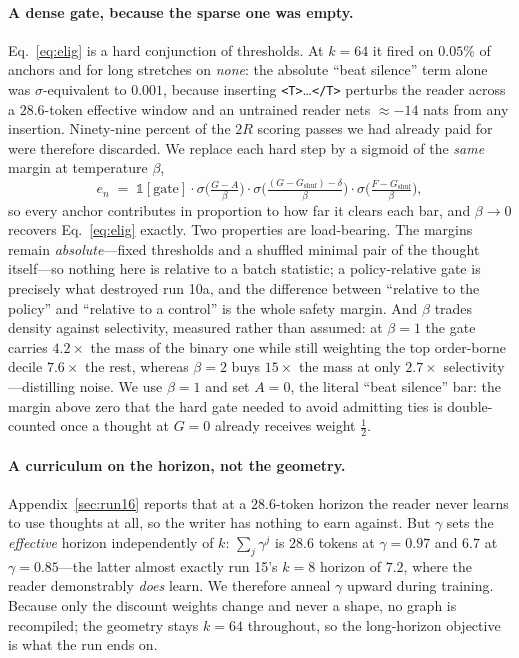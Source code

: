 \documentclass{article} %
\newcommand{\gain}{G}
\newcommand{\tstart}{\texttt{<T>}}
\newcommand{\tend}{\texttt{</T>}}
\begin{document}
\paragraph{A dense gate, because the sparse one was empty.} Eq.~\eqref{eq:elig} is a hard conjunction of thresholds. At $k{=}64$ it fired on $0.05\%$ of anchors and for long stretches on \emph{none}: the absolute ``beat silence'' term alone was $\sigma$-equivalent to $0.001$, because inserting \tstart{}\ldots\tend{} perturbs the reader across a $28.6$-token effective window and an untrained reader nets ${\approx}{-}14$ nats from any insertion. Ninety-nine percent of the $2R$ scoring passes we had already paid for were therefore discarded. We replace each hard step by a sigmoid of the \emph{same} margin at temperature $\beta$,
\begin{equation}
e_n \;=\; \mathbb{1}[\text{gate}] \cdot
\sigma\!\Big(\tfrac{\gain - A}{\beta}\Big)\cdot
\sigma\!\Big(\tfrac{(\gain - \gain_{\mathrm{shuf}}) - \delta}{\beta}\Big)\cdot
\sigma\!\Big(\tfrac{F - \gain_{\mathrm{shuf}}}{\beta}\Big),
\label{eq:softelig}
\end{equation}
so every anchor contributes in proportion to how far it clears each bar, and $\beta \to 0$ recovers Eq.~\eqref{eq:elig} exactly. Two properties are load-bearing. The margins remain \emph{absolute}---fixed thresholds and a shuffled minimal pair of the thought itself---so nothing here is relative to a batch statistic; a policy-relative gate is precisely what destroyed run 10a, and the difference between ``relative to the policy'' and ``relative to a control'' is the whole safety margin. And $\beta$ trades density against selectivity, measured rather than assumed: at $\beta{=}1$ the gate carries $4.2\times$ the mass of the binary one while still weighting the top order-borne decile $7.6\times$ the rest, whereas $\beta{=}2$ buys $15\times$ the mass at only $2.7\times$ selectivity---distilling noise. We use $\beta{=}1$ and set $A{=}0$, the literal ``beat silence'' bar: the margin above zero that the hard gate needed to avoid admitting ties is double-counted once a thought at $\gain{=}0$ already receives weight $\tfrac12$.

\paragraph{A curriculum on the horizon, not the geometry.} Appendix~\ref{sec:run16} reports that at a $28.6$-token horizon the reader never learns to use thoughts at all, so the writer has nothing to earn against. But $\gamma$ sets the \emph{effective} horizon independently of $k$: $\sum_j \gamma^{j}$ is $28.6$ tokens at $\gamma{=}0.97$ and $6.7$ at $\gamma{=}0.85$---the latter almost exactly run 15's $k{=}8$ horizon of $7.2$, where the reader demonstrably \emph{does} learn. We therefore anneal $\gamma$ upward during training. Because only the discount weights change and never a shape, no graph is recompiled; the geometry stays $k{=}64$ throughout, so the long-horizon objective is what the run ends on.
\end{document}
